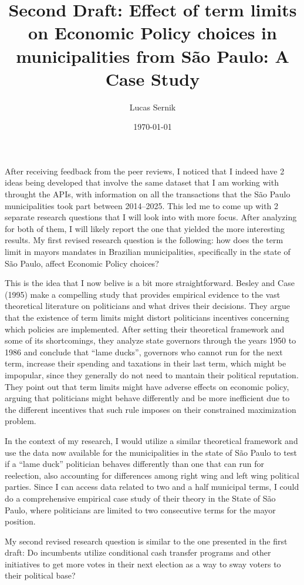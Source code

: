 \documentclass[12pt, a4paper]{article}
\author{Lucas Sernik}
\date{\today}
\title{Second Draft: Effect of term limits on Economic Policy choices in municipalities from São Paulo: A Case Study}
\begin{document}
\maketitle

\quad After receiving feedback from the peer reviews, I noticed that I indeed have 2 ideas being developed that involve the same dataset that I am working with throught the APIs, with information on all the transactions that the São Paulo municipalities took part between 2014--2025. This led me to come up with 2 separate research questions that I will look into with more focus. After analyzing for both of them, I will likely report the one that yielded the more interesting results. My first revised research question is the following: how does the term limit in mayors mandates in Brazilian municipalities, specifically in the state of São Paulo, affect Economic Policy choices?

\quad This is the idea that I now belive is a bit more straightforward. Besley and Case (1995) make a compelling study that provides empirical evidence to the vast theoretical literature on politicians and what drives their decisions. They argue that the existence of term limits might distort politicians incentives concerning which policies are implemented. After setting their theoretical framework and some of its shortcomings, they analyze state governors through the years 1950 to 1986 and conclude that ``lame ducks'', governors who cannot run for the next term, increase their spending and taxations in their last term, which might be impopular, since they generally do not need to mantain their political reputation. They point out that term limits might have adverse effects on economic policy, arguing that politicians might behave differently and be more inefficient due to the different incentives that such rule imposes on their constrained maximization problem.

\quad In the context of my research, I would utilize a similar theoretical framework and use the data now available for the municipalities in the state of São Paulo to test if a ``lame duck'' politician behaves differently than one that can run for reelection, also accounting for differences among right wing and left wing political parties. Since I can access data related to two and a half municipal terms, I could do a comprehensive empirical case study of their theory in the State of São Paulo, where politicians are limited to two consecutive terms for the mayor position.

\quad My second revised research question is similar to the one presented in the first draft: Do incumbents utilize conditional cash transfer programs and other initiatives to get more votes in their next election as a way to sway voters to their political base?
\end{document}
